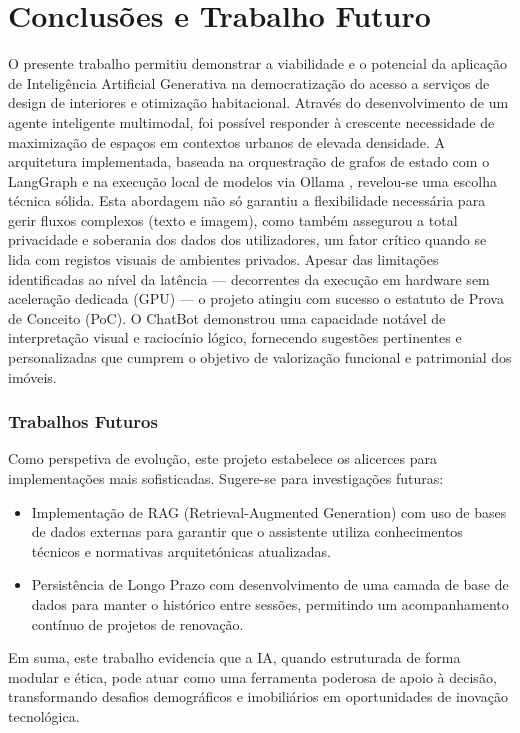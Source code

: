\documentclass[a4paper,12pt]{scrreprt}
\begin{document}
\chapter{Conclusões e Trabalho Futuro}
    O presente trabalho permitiu demonstrar a viabilidade e o potencial da aplicação de Inteligência Artificial Generativa na democratização do acesso a serviços de design de interiores e otimização habitacional. Através do desenvolvimento de um agente inteligente multimodal, foi possível responder à crescente necessidade de maximização de espaços em contextos urbanos de elevada densidade.
    A arquitetura implementada, baseada na orquestração de grafos de estado com o LangGraph \cite{langgraph} e na execução local de modelos via Ollama \cite{ollama}, revelou-se uma escolha técnica sólida. Esta abordagem não só garantiu a flexibilidade necessária para gerir fluxos complexos (texto e imagem), como também assegurou a total privacidade e soberania dos dados dos utilizadores, um fator crítico quando se lida com registos visuais de ambientes privados.
    Apesar das limitações identificadas ao nível da latência — decorrentes da execução em hardware sem aceleração dedicada (GPU) — o projeto atingiu com sucesso o estatuto de Prova de Conceito (PoC). O ChatBot demonstrou uma capacidade notável de interpretação visual e raciocínio lógico, fornecendo sugestões pertinentes e personalizadas que cumprem o objetivo de valorização funcional e patrimonial dos imóveis.
    
    \subsection{Trabalhos Futuros}
    Como perspetiva de evolução, este projeto estabelece os alicerces para implementações mais sofisticadas. Sugere-se para investigações futuras:
    \begin{itemize}
        \item Implementação de RAG (Retrieval-Augmented Generation) com uso de bases de dados externas para garantir que o assistente utiliza conhecimentos técnicos e normativas arquitetónicas atualizadas.
        \item Persistência de Longo Prazo com desenvolvimento de uma camada de base de dados para manter o histórico entre sessões, permitindo um acompanhamento contínuo de projetos de renovação.
    \end{itemize}
    Em suma, este trabalho evidencia que a IA, quando estruturada de forma modular e ética, pode atuar como uma ferramenta poderosa de apoio à decisão, transformando desafios demográficos e imobiliários em oportunidades de inovação tecnológica.
\end{document}
